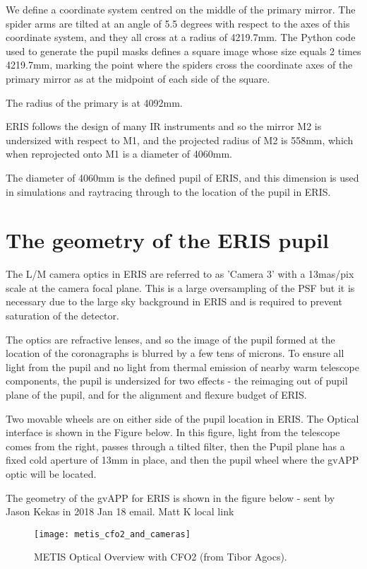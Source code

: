 \documentclass[a4paper,11pt]{article}
\begin{document}
We define a coordinate system centred on the middle of the primary mirror. The
spider arms are tilted at an angle of 5.5 degrees with respect to the axes of
this coordinate system, and they all cross at a radius of 4219.7mm. The Python
code used to generate the pupil masks defines a square image whose size equals
2 times 4219.7mm, marking the point where the spiders cross the coordinate axes
of the primary mirror as at the midpoint of each side of the square.

The radius of the primary is at 4092mm.

ERIS follows the design of many IR instruments and so the mirror M2 is
undersized with respect to M1, and the projected radius of M2 is 558mm, which
when reprojected onto M1 is a diameter of 4060mm.

The diameter of 4060mm is the defined pupil of ERIS, and this dimension is used
in simulations and raytracing through to the location of the pupil in ERIS.

\section{The geometry of the ERIS pupil}

The L/M camera optics in ERIS are referred to as 'Camera 3' with a 13mas/pix
scale at the camera focal plane. This is a large oversampling of the PSF but it
is necessary due to the large sky background in ERIS and is required to prevent
saturation of the detector.

The optics are refractive lenses, and so the image of the pupil formed at the
location of the coronagraphs is blurred by a few tens of microns. To ensure all
light from the pupil and no light from thermal emission of nearby warm
telescope components, the pupil is undersized for two effects - the reimaging
out of pupil plane of the pupil, and for the alignment and flexure budget of
ERIS.

Two movable wheels are on either side of the pupil location in ERIS. The
Optical interface is shown in the Figure below. In this figure, light from the
telescope comes from the right, passes through a tilted filter, then the Pupil
plane has a fixed cold aperture of 13mm in place, and then the pupil wheel
where the gvAPP optic will be located.


The geometry of the gvAPP for ERIS is shown in the figure below - sent by Jason
Kekas in 2018 Jan 18 email. Matt K local link

\begin{figure}[htp]
\centering
\texttt{[image: metis\_cfo2\_and\_cameras]}
\caption{ \label{mov} METIS Optical Overview with CFO2 (from Tibor Agocs).}
\end{figure}
\end{document}
